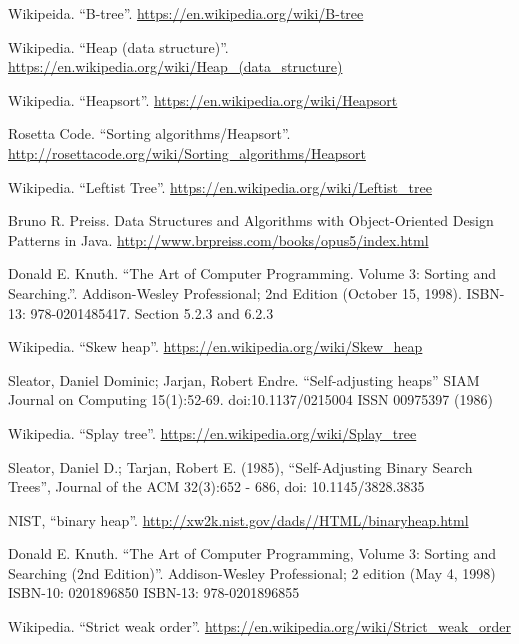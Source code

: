 \begin{thebibliography}{99}

Wikipeida. ``B-tree''. \url{https://en.wikipedia.org/wiki/B-tree}


Wikipedia. ``Heap (data structure)''. \url{https://en.wikipedia.org/wiki/Heap_(data_structure)}

Wikipedia. ``Heapsort''. \url{https://en.wikipedia.org/wiki/Heapsort}

Rosetta Code. ``Sorting algorithms/Heapsort''.  \url{http://rosettacode.org/wiki/Sorting_algorithms/Heapsort}

Wikipedia. ``Leftist Tree''. \url{https://en.wikipedia.org/wiki/Leftist_tree}

Bruno R. Preiss. Data Structures and Algorithms with Object-Oriented Design Patterns in Java. \url{http://www.brpreiss.com/books/opus5/index.html}

Donald E. Knuth. ``The Art of Computer Programming. Volume 3: Sorting and Searching.''. Addison-Wesley Professional;
2nd Edition (October 15, 1998). ISBN-13: 978-0201485417. Section 5.2.3 and 6.2.3

Wikipedia. ``Skew heap''. \url{https://en.wikipedia.org/wiki/Skew_heap}

Sleator, Daniel Dominic; Jarjan, Robert Endre. ``Self-adjusting heaps'' SIAM Journal on Computing 15(1):52-69. doi:10.1137/0215004 ISSN 00975397 (1986)

Wikipedia. ``Splay tree''. \url{https://en.wikipedia.org/wiki/Splay_tree}

Sleator, Daniel D.; Tarjan, Robert E. (1985), ``Self-Adjusting Binary Search Trees'', Journal of the ACM 32(3):652 - 686, doi: 10.1145/3828.3835

NIST, ``binary heap''. \url{http://xw2k.nist.gov/dads//HTML/binaryheap.html}

Donald E. Knuth. ``The Art of Computer Programming, Volume 3: Sorting and Searching (2nd Edition)''. Addison-Wesley Professional; 2 edition (May 4, 1998) ISBN-10: 0201896850 ISBN-13: 978-0201896855

Wikipedia. ``Strict weak order''. \url{https://en.wikipedia.org/wiki/Strict_weak_order}


\end{thebibliography}
